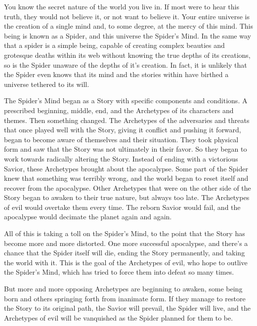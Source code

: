\documentclass[blue]{Silversiders}
\begin{document}
\name{\bSpider{}}

You know the secret nature of the world you live in. If most were to hear this truth, they would not believe it, or not want to believe it. Your entire universe is the creation of a single mind and, to some degree, at the mercy of this mind. This being is known as a Spider, and this universe the Spider's Mind. In the same way that a spider is a simple being, capable of creating complex beauties and grotesque deaths within its web without knowing the true depths of its creations, so is the Spider unaware of the depths of it's creation. In fact, it is unlikely that the Spider even knows that its mind and the stories within have birthed a universe tethered to its will.

The Spider's Mind began as a Story with specific components and conditions. A prescribed beginning, middle, end, and the Archetypes of its characters and themes. Then something changed. The Archetypes of the adversaries and threats that once played well with the Story, giving it conflict and pushing it forward, began to become aware of themselves and their situation. They took physical form and saw that the Story was not ultimately in their favor. So they began to work towards radically altering the Story. Instead of ending with a victorious Savior, these Archetypes brought about the apocalypse. Some part of the Spider knew that something was terribly wrong, and the world began to reset itself and recover from the apocalypse. Other Archetypes that were on the other side of the Story began to awaken to their true nature, but always too late. The Archetypes of evil would overtake them every time. The reborn Savior would fail, and the apocalypse would decimate the planet again and again.

All of this is taking a toll on the Spider's Mind, to the point that the Story has become more and more distorted. One more successful apocalypse, and there's a chance that the Spider itself will die, ending the Story permanently, and taking the world with it. This is the goal of the Archetypes of evil, who hope to outlive the Spider's Mind, which has tried to force them into defeat so many times.

But more and more opposing Archetypes are beginning to awaken, some being born and others springing forth from inanimate form. If they manage to restore the Story to its original path, the Savior will prevail, the Spider will live, and the Archetypes of evil will be vanquished as the Spider planned for them to be.
\end{document}
